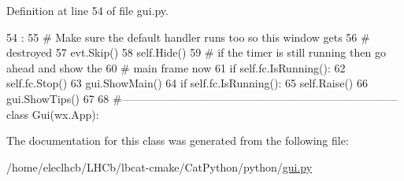 Definition at line 54 of file gui.py.


\begin{DoxyCode}
54                           :
55         # Make sure the default handler runs too so this window gets
56         # destroyed
57         evt.Skip()
58         self.Hide()
59         # if the timer is still running then go ahead and show the
60         # main frame now
61         if self.fc.IsRunning():
62             self.fc.Stop()
63             gui.ShowMain()
64             if self.fc.IsRunning():
65                 self.Raise()
66             gui.ShowTips()
67             
68 #---------------------------------------------------------------------------
class Gui(wx.App):
\end{DoxyCode}


The documentation for this class was generated from the following file:\begin{DoxyCompactItemize}
\item 
/home/eleclhcb/LHCb/lbcat-\/cmake/CatPython/python/\hyperlink{gui_8py}{gui.py}\end{DoxyCompactItemize}
